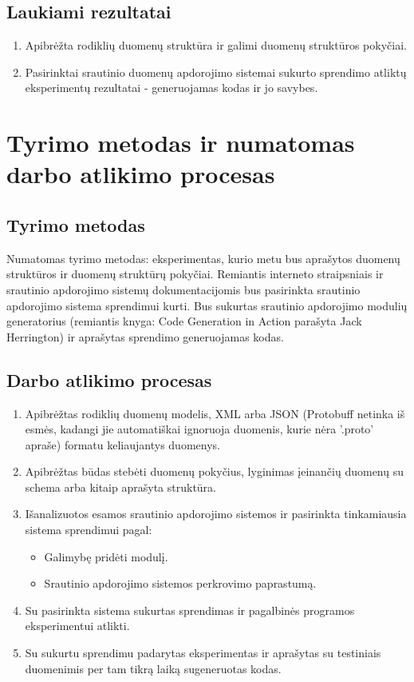 \documentclass{VUMIFPSbakalaurinis}
\begin{document}
\subsection{Laukiami rezultatai}
\begin{enumerate}
    \item Apibrėžta rodiklių duomenų struktūra ir galimi duomenų struktūros pokyčiai.
    \item Pasirinktai srautinio duomenų apdorojimo sistemai sukurto sprendimo atliktų eksperimentų rezultatai - generuojamas kodas ir jo savybes. 
    
\end{enumerate}
\section{Tyrimo metodas ir numatomas darbo atlikimo procesas}

\subsection{Tyrimo metodas}
Numatomas tyrimo metodas: eksperimentas, kurio metu bus aprašytos duomenų struktūros ir duomenų struktūrų pokyčiai. Remiantis interneto straipsniais ir srautinio apdorojimo sistemų dokumentacijomis bus pasirinkta srautinio apdorojimo sistema sprendimui kurti. Bus sukurtas srautinio apdorojimo modulių generatorius (remiantis knyga: Code Generation in Action parašyta Jack Herrington) ir aprašytas sprendimo generuojamas kodas. \par 

\subsection{Darbo atlikimo procesas}
\begin{enumerate}
    \item Apibrėžtas rodiklių duomenų modelis, XML arba JSON (Protobuff netinka iš esmės, kadangi jie automatiškai ignoruoja duomenis, kurie nėra 
    '.proto' apraše) formatu keliaujantys duomenys.
    \item Apibrėžtas būdas stebėti duomenų pokyčius, lyginimas įeinančių duomenų su schema arba kitaip aprašyta struktūra.
    \item Išanalizuotos esamos srautinio apdorojimo sistemos ir pasirinkta tinkamiausia sistema sprendimui pagal:
    	\begin{itemize}
		\item Galimybę pridėti modulį.
		\item Srautinio apdorojimo sistemos perkrovimo paprastumą.
	\end{itemize}
    \item Su pasirinkta sistema sukurtas sprendimas ir pagalbinės programos eksperimentui atlikti.
    \item Su sukurtu sprendimu padarytas eksperimentas ir aprašytas su testiniais duomenimis per tam tikrą laiką sugeneruotas kodas. 
\end{enumerate}
\end{document}
